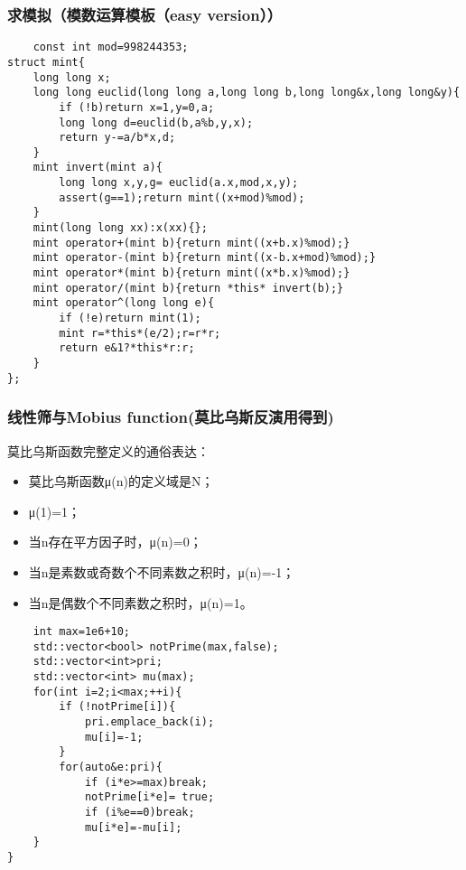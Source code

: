 \documentclass[UTF8]{ctexart}
\begin{document}
\subsubsection{求模拟（模数运算模板（easy version））}
\begin{lstlisting}
    const int mod=998244353;
struct mint{
    long long x;
    long long euclid(long long a,long long b,long long&x,long long&y){
        if (!b)return x=1,y=0,a;
        long long d=euclid(b,a%b,y,x);
        return y-=a/b*x,d;
    }
    mint invert(mint a){
        long long x,y,g= euclid(a.x,mod,x,y);
        assert(g==1);return mint((x+mod)%mod);
    }
    mint(long long xx):x(xx){};
    mint operator+(mint b){return mint((x+b.x)%mod);}
    mint operator-(mint b){return mint((x-b.x+mod)%mod);}
    mint operator*(mint b){return mint((x*b.x)%mod);}
    mint operator/(mint b){return *this* invert(b);}
    mint operator^(long long e){
        if (!e)return mint(1);
        mint r=*this*(e/2);r=r*r;
        return e&1?*this*r:r;
    }
};
\end{lstlisting}
\subsubsection{线性筛与Mobius function(莫比乌斯反演用得到)}
莫比乌斯函数完整定义的通俗表达：
\begin{itemize}
    \item 莫比乌斯函数μ(n)的定义域是N；
    \item μ(1)=1；
    \item 当n存在平方因子时，μ(n)=0；
    \item 当n是素数或奇数个不同素数之积时，μ(n)=-1；
    \item 当n是偶数个不同素数之积时，μ(n)=1。
\end{itemize}
\begin{lstlisting}
    int max=1e6+10;
    std::vector<bool> notPrime(max,false);
    std::vector<int>pri;
    std::vector<int> mu(max);
    for(int i=2;i<max;++i){
        if (!notPrime[i]){
            pri.emplace_back(i);
            mu[i]=-1;
        }
        for(auto&e:pri){
            if (i*e>=max)break;
            notPrime[i*e]= true;
            if (i%e==0)break;
            mu[i*e]=-mu[i];
    }
}
\end{lstlisting}
\end{document}
